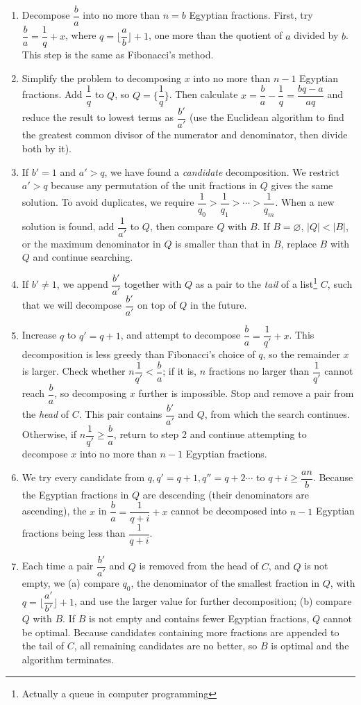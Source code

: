 \begin{enumerate}[1)]
  \item Decompose $\dfrac{b}{a}$ into no more than $n=b$ Egyptian fractions. First, try $\dfrac{b}{a}=\dfrac{1}{q}+x$, where $q=\lfloor\dfrac{a}{b}\rfloor+1$, one more than the quotient of $a$ divided by $b$. This step is the same as Fibonacci's method.
  \item Simplify the problem to decomposing $x$ into no more than $n-1$ Egyptian fractions. Add $\dfrac{1}{q}$ to $Q$, so $Q=\{\dfrac{1}{q}\}$. Then calculate $x=\dfrac{b}{a}-\dfrac{1}{q}=\dfrac{bq-a}{aq}$ and reduce the result to lowest terms as $\dfrac{b'}{a'}$ (use the Euclidean algorithm to find the greatest common divisor of the numerator and denominator, then divide both by it).
  \item If $b'=1$ and $a'>q$, we have found a \emph{candidate} decomposition. We restrict $a'>q$ because any permutation of the unit fractions in $Q$ gives the same solution. To avoid duplicates, we require $\dfrac{1}{q_0}>\dfrac{1}{q_1}>\cdots>\dfrac{1}{q_m}$. When a new solution is found, add $\dfrac{1}{a'}$ to $Q$, then compare $Q$ with $B$. If $B=\varnothing$, $|Q|<|B|$, or the maximum denominator in $Q$ is smaller than that in $B$, replace $B$ with $Q$ and continue searching.
  \item If $b' \ne 1$, we append $\dfrac{b'}{a'}$ together with $Q$ as a pair to the \emph{tail} of a list\footnote{Actually a queue in computer programming} $C$, such that we will decompose $\dfrac{b'}{a'}$ on top of $Q$ in the future.
  \item Increase $q$ to $q'=q+1$, and attempt to decompose $\dfrac{b}{a}=\dfrac{1}{q'}+x$. This decomposition is less greedy than Fibonacci's choice of $q$, so the remainder $x$ is larger. Check whether $n\dfrac{1}{q'}<\dfrac{b}{a}$; if it is, $n$ fractions no larger than $\dfrac{1}{q'}$ cannot reach $\dfrac{b}{a}$, so decomposing $x$ further is impossible. Stop and remove a pair from the \emph{head} of $C$. This pair contains $\dfrac{b'}{a'}$ and $Q$, from which the search continues. Otherwise, if $n\dfrac{1}{q'}\geq\dfrac{b}{a}$, return to step 2 and continue attempting to decompose $x$ into no more than $n-1$ Egyptian fractions.
  \item We try every candidate from $q, q' = q + 1, q'' = q + 2 \cdots $ to $q + i \geq \dfrac{an}{b}$. Because the Egyptian fractions in $Q$ are descending (their denominators are ascending), the $x$ in $\dfrac{b}{a} = \dfrac{1}{q+i} + x$ cannot be decomposed into $n-1$ Egyptian fractions being less than $\dfrac{1}{q+i}$.
  \item Each time a pair $\dfrac{b'}{a'}$ and $Q$ is removed from the head of $C$, and $Q$ is not empty, we (a) compare $q_0$, the denominator of the smallest fraction in $Q$, with $q=\lfloor\dfrac{a'}{b'}\rfloor+1$, and use the larger value for further decomposition; (b) compare $Q$ with $B$. If $B$ is not empty and contains fewer Egyptian fractions, $Q$ cannot be optimal. Because candidates containing more fractions are appended to the tail of $C$, all remaining candidates are no better, so $B$ is optimal and the algorithm terminates.
\end{enumerate}

